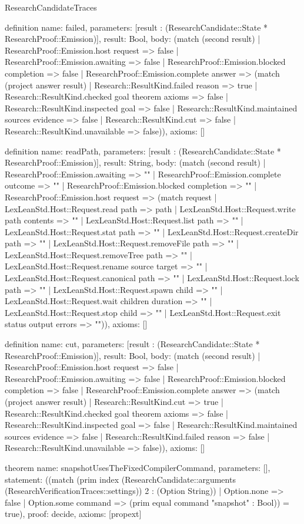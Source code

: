 \begin{lexlean}{ResearchCandidateTraces}
\begin{semanticmodule}
definition{
 name: failed,
 parameters: [result : (ResearchCandidate::State * ResearchProof::Emission)],
 result: Bool,
 body: (match (second result) | ResearchProof::Emission.host request => false | ResearchProof::Emission.awaiting => false | ResearchProof::Emission.blocked completion => false | ResearchProof::Emission.complete answer => (match (project answer result) | Research::ResultKind.failed reason => true | Research::ResultKind.checked goal theorem axioms => false | Research::ResultKind.inspected goal => false | Research::ResultKind.maintained sources evidence => false | Research::ResultKind.cut => false | Research::ResultKind.unavailable => false)),
 axioms: []
}

definition{
 name: readPath,
 parameters: [result : (ResearchCandidate::State * ResearchProof::Emission)],
 result: String,
 body: (match (second result) | ResearchProof::Emission.awaiting => "" | ResearchProof::Emission.complete outcome => "" | ResearchProof::Emission.blocked completion => "" | ResearchProof::Emission.host request => (match request | LexLeanStd.Host::Request.read path => path | LexLeanStd.Host::Request.write path contents => "" | LexLeanStd.Host::Request.list path => "" | LexLeanStd.Host::Request.stat path => "" | LexLeanStd.Host::Request.createDir path => "" | LexLeanStd.Host::Request.removeFile path => "" | LexLeanStd.Host::Request.removeTree path => "" | LexLeanStd.Host::Request.rename source target => "" | LexLeanStd.Host::Request.canonical path => "" | LexLeanStd.Host::Request.lock path => "" | LexLeanStd.Host::Request.spawn child => "" | LexLeanStd.Host::Request.wait children duration => "" | LexLeanStd.Host::Request.stop child => "" | LexLeanStd.Host::Request.exit status output errors => "")),
 axioms: []
}

definition{
 name: cut,
 parameters: [result : (ResearchCandidate::State * ResearchProof::Emission)],
 result: Bool,
 body: (match (second result) | ResearchProof::Emission.host request => false | ResearchProof::Emission.awaiting => false | ResearchProof::Emission.blocked completion => false | ResearchProof::Emission.complete answer => (match (project answer result) | Research::ResultKind.cut => true | Research::ResultKind.checked goal theorem axioms => false | Research::ResultKind.inspected goal => false | Research::ResultKind.maintained sources evidence => false | Research::ResultKind.failed reason => false | Research::ResultKind.unavailable => false)),
 axioms: []
}

theorem{
 name: snapshotUsesTheFixedCompilerCommand,
 parameters: [],
 statement: ((match (prim index (ResearchCandidate::arguments (ResearchVerificationTraces::settings)) 2 : (Option String)) | Option.none => false | Option.some command => (prim equal command "snapshot" : Bool)) = true),
 proof: decide{},
 axioms: [propext]
}


\end{semanticmodule}
\end{lexlean}
